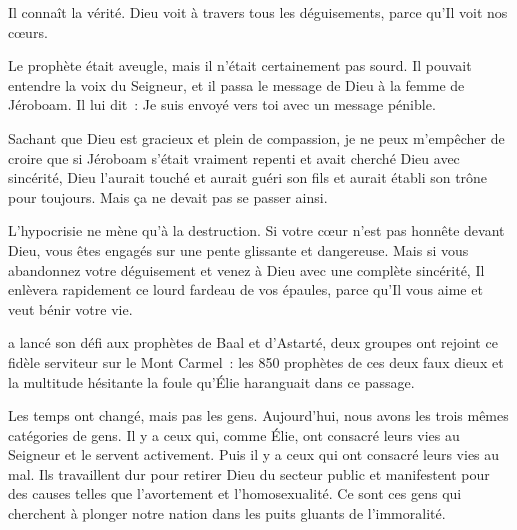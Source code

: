 Il connaît la vérité. Dieu voit à travers tous les déguisements,
 parce qu'Il voit nos c\oe{}urs. 

Le prophète était aveugle, mais il n'était certainement pas sourd.
 Il pouvait entendre la voix du Seigneur, et il passa le message de Dieu
 à la femme de Jéroboam.  Il lui dit~:
 \og Je suis envoyé vers toi avec un message pénible. \fg{}

Sachant que Dieu est gracieux et plein de compassion,
 je ne peux m'empêcher de croire que si Jéroboam s'était vraiment repenti
 et avait cherché Dieu avec sincérité, Dieu l'aurait touché
 et aurait guéri son fils et aurait établi son trône pour toujours.
 Mais ça ne devait pas se passer ainsi. 

L'hypocrisie ne mène qu'à la destruction.
 Si votre c\oe{}ur n'est pas honnête devant Dieu,
 vous êtes engagés sur une pente glissante et dangereuse.
 Mais si vous abandonnez votre déguisement et venez à Dieu
 avec une complète sincérité, Il enlèvera rapidement ce lourd fardeau
 de vos épaules, parce qu'Il vous aime et veut bénir votre vie. 

\dvrule






 a lancé son défi aux prophètes
 de Baal et d'Astarté, deux groupes ont rejoint ce fidèle serviteur
 sur le Mont Carmel~: les 850 \og prophètes \fg{} de ces deux faux dieux
 et la multitude hésitante
 \ocadr la foule qu'Élie haranguait dans ce passage. 

Les temps ont changé, mais pas les gens.
 Aujourd'hui, nous avons les trois mêmes catégories de gens.
 Il y a ceux qui, comme Élie, ont consacré leurs vies au Seigneur
 et le servent activement.
 Puis il y a ceux qui ont consacré leurs vies au mal.
 Ils travaillent dur pour retirer Dieu du secteur public
 et manifestent pour des causes telles que l'avortement et l'homosexualité.
 Ce sont ces gens qui cherchent à plonger notre nation
 dans les puits gluants de l'immoralité. 

